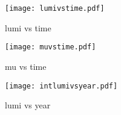 \begin{figure}
\centering
\texttt{[image: lumivstime.pdf]}
\label{fig:lhc:lumivstime}
\caption{lumi vs time}
\end{figure}




\begin{figure}
\centering
\texttt{[image: muvstime.pdf]}
\label{fig:lhc:lumivstime}
\caption{mu vs time}
\end{figure}




\begin{figure}
\centering
\texttt{[image: intlumivsyear.pdf]}
\label{fig:lhc:lumivsyear}
\caption{lumi vs year}
\end{figure}


